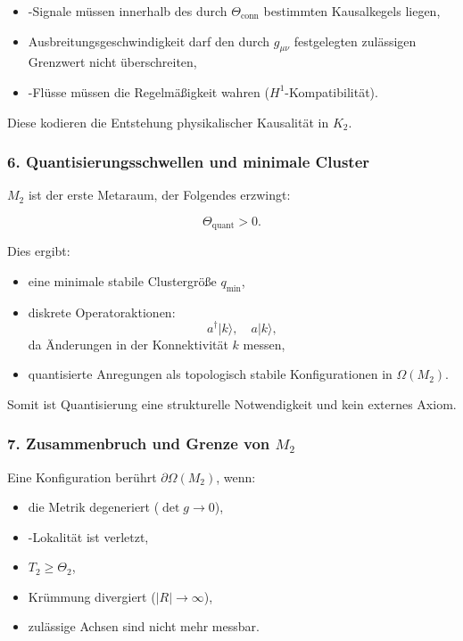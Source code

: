 \begin{itemize}
    \item-Signale müssen innerhalb des durch $\Theta_{\text{conn}}$ bestimmten Kausalkegels liegen,
    \item Ausbreitungsgeschwindigkeit darf den durch $g_{\mu\nu}$ festgelegten zulässigen Grenzwert nicht überschreiten,
    \item-Flüsse müssen die Regelmäßigkeit wahren ($H^1$-Kompatibilität).
\end{itemize}

Diese kodieren die Entstehung physikalischer Kausalität in $K_2$.

\subsubsection*{6. Quantisierungsschwellen und minimale Cluster}

$M_2$ ist der erste Metaraum, der Folgendes erzwingt:

\[
\Theta_{\text{quant}} > 0.
\]

Dies ergibt:

\begin{itemize}
    \item eine minimale stabile Clustergröße $q_{\min}$,
    \item diskrete Operatoraktionen:
    \[
    a^\dagger |k\rangle,\quad a |k\rangle,
    \]
    da Änderungen in der Konnektivität $k$ messen,
    \item quantisierte Anregungen als topologisch stabile Konfigurationen in $\Omega(M_2)$.
\end{itemize}

Somit ist Quantisierung eine strukturelle Notwendigkeit und kein externes Axiom.

\subsubsection*{7. Zusammenbruch und Grenze von \texorpdfstring{$M_2$}{M_2}}

Eine Konfiguration berührt $\partial\Omega(M_2)$, wenn:

\begin{itemize}
    \item die Metrik degeneriert ($\det g \to 0$),
    \item-Lokalität ist verletzt,
    \item $T_2 \ge \Theta_2$,
    \item Krümmung divergiert ($|R| \to \infty$),
    \item zulässige Achsen sind nicht mehr messbar.
\end{itemize}

